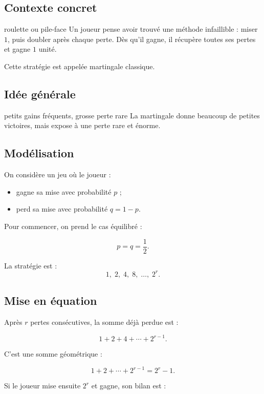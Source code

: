 \documentclass[11pt,a4paper]{article}
\begin{document}
\subsection{Contexte concret}

\begin{contexte}{roulette ou pile-face}
Un joueur pense avoir trouvé une méthode infaillible : miser $1$, puis doubler après chaque perte. Dès qu'il gagne, il récupère toutes ses pertes et gagne $1$ unité.

Cette stratégie est appelée martingale classique.
\end{contexte}

\subsection{Idée générale}

\begin{idee}{petits gains fréquents, grosse perte rare}
La martingale donne beaucoup de petites victoires, mais expose à une perte rare et énorme.
\end{idee}

\subsection{Modélisation}

On considère un jeu où le joueur :
\begin{itemize}
    \item gagne sa mise avec probabilité $p$ ;
    \item perd sa mise avec probabilité $q=1-p$.
\end{itemize}

Pour commencer, on prend le cas équilibré :

\[
p=q=\frac12.
\]

La stratégie est :
\[
1,\;2,\;4,\;8,\;\dots,\;2^r.
\]

\subsection{Mise en équation}

Après $r$ pertes consécutives, la somme déjà perdue est :

\[
1+2+4+\cdots+2^{r-1}.
\]

C'est une somme géométrique :

\[
1+2+\cdots+2^{r-1}=2^r-1.
\]

Si le joueur mise ensuite $2^r$ et gagne, son bilan est :
\end{document}

